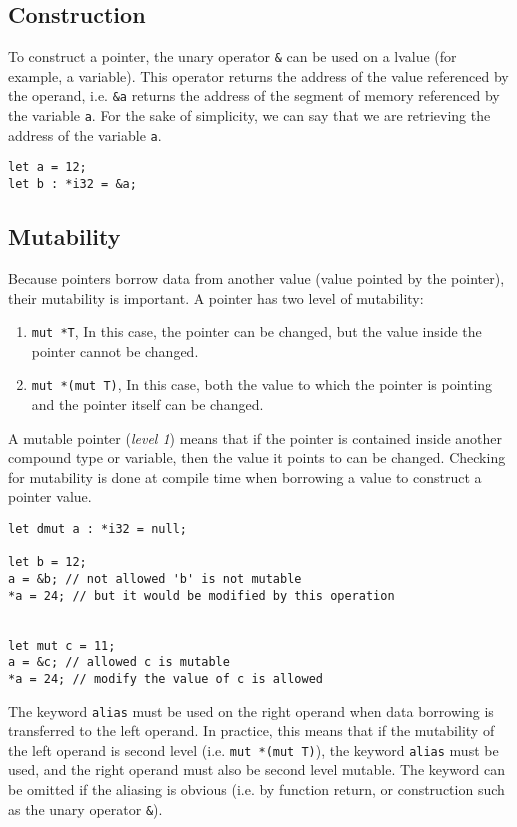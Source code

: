 \subsection {Construction}

To construct a pointer, the unary operator \texttt{\&} can be used on a lvalue
(for example, a variable). This operator returns the address of the value
referenced by the operand, i.e. \texttt{\&a} returns the address of the segment
of memory referenced by the variable \texttt{a}. For the sake of simplicity, we
can say that we are retrieving the address of the variable \texttt{a}.

\begin{lstlisting}[style=coloredverbatim]
let a = 12;
let b : *i32 = &a;
\end{lstlisting}

\subsection {Mutability}

Because pointers borrow data from another value (value pointed by the pointer),
their mutability is important. A pointer has two level of mutability:
\begin{enumerate}
\item \texttt{mut *T}, In this case, the pointer can be changed, but the value
  inside the pointer cannot be changed.
\item \texttt{mut *(mut T)}, In this case, both the value to which the pointer
  is pointing and the pointer itself can be changed.
\end{enumerate}

A mutable pointer (\textit{level 1}) means that if the pointer is contained
inside another compound type or variable, then the value it points to can be
changed. Checking for mutability is done at compile time when borrowing a value
to construct a pointer value.

\begin{lstlisting}[style=coloredverbatim]
let dmut a : *i32 = null;

let b = 12;
a = &b; // not allowed 'b' is not mutable
*a = 24; // but it would be modified by this operation


let mut c = 11;
a = &c; // allowed c is mutable
*a = 24; // modify the value of c is allowed
\end{lstlisting}

The keyword \texttt{alias} must be used on the right operand when data borrowing
is transferred to the left operand. In practice, this means that if the
mutability of the left operand is second level (i.e. \texttt{mut *(mut T)}), the
keyword \texttt{alias} must be used, and the right operand must also be second
level mutable. The keyword can be omitted if the aliasing is obvious (i.e. by
function return, or construction such as the unary operator \texttt{\&}).

